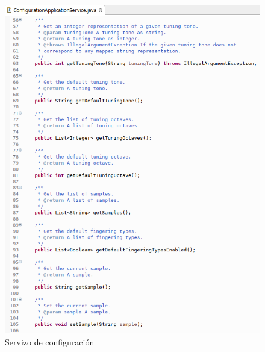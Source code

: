    \begin{figure}[htbp]
    \centering
    \includegraphics[scale=0.6, keepaspectratio=true]{./imagenes/servizo-configuracion-2.png}
    \caption{Servizo de configuración}
    \label{figura:ServizoConfiguracion2}
   \end{figure}
   
